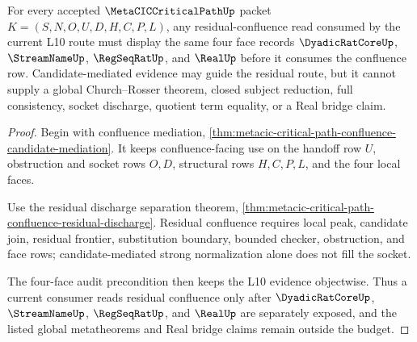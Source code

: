 \begin{theorem}
\label{thm:metacic-critical-path-residual-confluence-budget}
For every accepted $\MetaCICCriticalPathUp$ packet $K=(S,N,O,U,D,H,C,P,L)$, any residual-confluence read consumed by the current L10 route must display the same four face records $\DyadicRatCoreUp$, $\StreamNameUp$, $\RegSeqRatUp$, and $\RealUp$ before it consumes the confluence row. Candidate-mediated evidence may guide the residual route, but it cannot supply a global Church--Rosser theorem, closed subject reduction, full consistency, socket discharge, quotient term equality, or a Real bridge claim.
\end{theorem}
\begin{proof}
Begin with confluence mediation, \autoref{thm:metacic-critical-path-confluence-candidate-mediation}. It keeps confluence-facing use on the handoff row $U$, obstruction and socket rows $O,D$, structural rows $H,C,P,L$, and the four local faces.

Use the residual discharge separation theorem, \autoref{thm:metacic-critical-path-confluence-residual-discharge}. Residual confluence requires local peak, candidate join, residual frontier, substitution boundary, bounded checker, obstruction, and face rows; candidate-mediated strong normalization alone does not fill the socket.

The four-face audit precondition then keeps the L10 evidence objectwise. Thus a current consumer reads residual confluence only after $\DyadicRatCoreUp$, $\StreamNameUp$, $\RegSeqRatUp$, and $\RealUp$ are separately exposed, and the listed global metatheorems and Real bridge claims remain outside the budget.
\end{proof}

